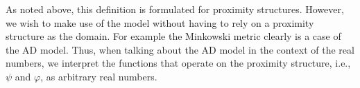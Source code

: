 \begin{rem}
As noted above, this definition is formulated for proximity structures. However, we wish to make use of the model without having to rely on a proximity structure as the domain. For example the Minkowski metric clearly is a case of the AD model. Thus, when talking about the AD model in the context of the real numbers, we interpret the functions that operate on the proximity structure, i.e., $\psi$ and $\varphi$, as arbitrary real numbers.
\end{rem}
